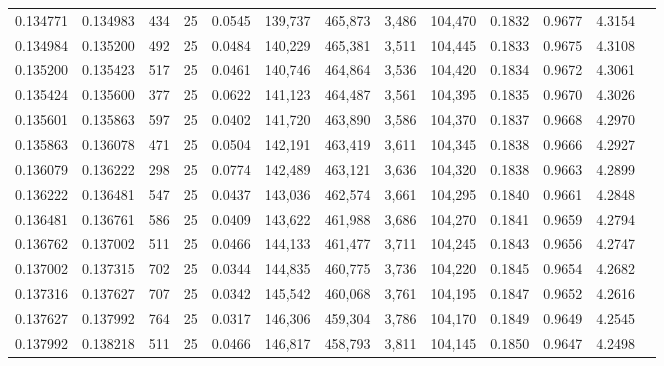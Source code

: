 \begin{tabular}{rrrrrrrrrrrrr}
0.134771 & 0.134983 &   434 &  25 &                                     0.0545 & 139,737 & 465,873 &   3,486 & 104,470 & 0.1832 & 0.9677 & 4.3154 \\
0.134984 & 0.135200 &   492 &  25 &                                     0.0484 & 140,229 & 465,381 &   3,511 & 104,445 & 0.1833 & 0.9675 & 4.3108 \\
0.135200 & 0.135423 &   517 &  25 &                                     0.0461 & 140,746 & 464,864 &   3,536 & 104,420 & 0.1834 & 0.9672 & 4.3061 \\
0.135424 & 0.135600 &   377 &  25 &                                     0.0622 & 141,123 & 464,487 &   3,561 & 104,395 & 0.1835 & 0.9670 & 4.3026 \\
0.135601 & 0.135863 &   597 &  25 &                                     0.0402 & 141,720 & 463,890 &   3,586 & 104,370 & 0.1837 & 0.9668 & 4.2970 \\
0.135863 & 0.136078 &   471 &  25 &                                     0.0504 & 142,191 & 463,419 &   3,611 & 104,345 & 0.1838 & 0.9666 & 4.2927 \\
0.136079 & 0.136222 &   298 &  25 &                                     0.0774 & 142,489 & 463,121 &   3,636 & 104,320 & 0.1838 & 0.9663 & 4.2899 \\
0.136222 & 0.136481 &   547 &  25 &                                     0.0437 & 143,036 & 462,574 &   3,661 & 104,295 & 0.1840 & 0.9661 & 4.2848 \\
0.136481 & 0.136761 &   586 &  25 &                                     0.0409 & 143,622 & 461,988 &   3,686 & 104,270 & 0.1841 & 0.9659 & 4.2794 \\
0.136762 & 0.137002 &   511 &  25 &                                     0.0466 & 144,133 & 461,477 &   3,711 & 104,245 & 0.1843 & 0.9656 & 4.2747 \\
0.137002 & 0.137315 &   702 &  25 &                                     0.0344 & 144,835 & 460,775 &   3,736 & 104,220 & 0.1845 & 0.9654 & 4.2682 \\
0.137316 & 0.137627 &   707 &  25 &                                     0.0342 & 145,542 & 460,068 &   3,761 & 104,195 & 0.1847 & 0.9652 & 4.2616 \\
0.137627 & 0.137992 &   764 &  25 &                                     0.0317 & 146,306 & 459,304 &   3,786 & 104,170 & 0.1849 & 0.9649 & 4.2545 \\
0.137992 & 0.138218 &   511 &  25 &                                     0.0466 & 146,817 & 458,793 &   3,811 & 104,145 & 0.1850 & 0.9647 & 4.2498 \\

\end{tabular}
